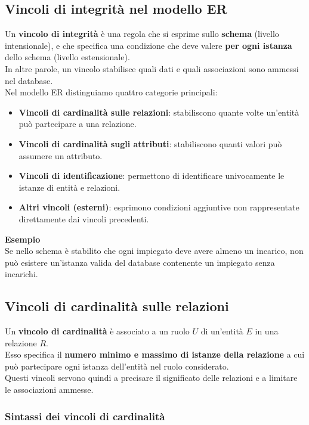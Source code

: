 \subsection{Vincoli di integrità nel modello ER}

Un \textbf{vincolo di integrità} è una regola che si esprime sullo
\textbf{schema} (livello intensionale), e che specifica una
condizione che deve valere \textbf{per ogni istanza} dello schema (livello estensionale).\\
In altre parole, un vincolo stabilisce quali dati e quali associazioni
sono ammessi nel database.\\
Nel modello ER distinguiamo quattro categorie principali:
\begin{itemize}
    \item \textbf{Vincoli di cardinalità sulle relazioni}: stabiliscono
    quante volte un'entità può partecipare a una relazione.
    \item \textbf{Vincoli di cardinalità sugli attributi}: stabiliscono
    quanti valori può assumere un attributo.
    \item \textbf{Vincoli di identificazione}: permettono di identificare
    univocamente le istanze di entità e relazioni.
    \item \textbf{Altri vincoli (esterni)}: esprimono condizioni aggiuntive
    non rappresentate direttamente dai vincoli precedenti.
\end{itemize}
\noindent
\textcolor{verdeEsempio}{\textbf{Esempio}}\\
Se nello schema è stabilito che ogni impiegato deve avere almeno
un incarico, non può esistere un'istanza valida del database
contenente un impiegato senza incarichi.

\subsection{Vincoli di cardinalità sulle relazioni}

Un \textbf{vincolo di cardinalità} è associato a un ruolo $U$
di un'entità $E$ in una relazione $R$.\\
Esso specifica il \textbf{numero minimo e massimo di istanze
della relazione} a cui può partecipare ogni istanza dell'entità
nel ruolo considerato.\\
Questi vincoli servono quindi a precisare il significato
delle relazioni e a limitare le associazioni ammesse.

\subsubsection*{Sintassi dei vincoli di cardinalità}

